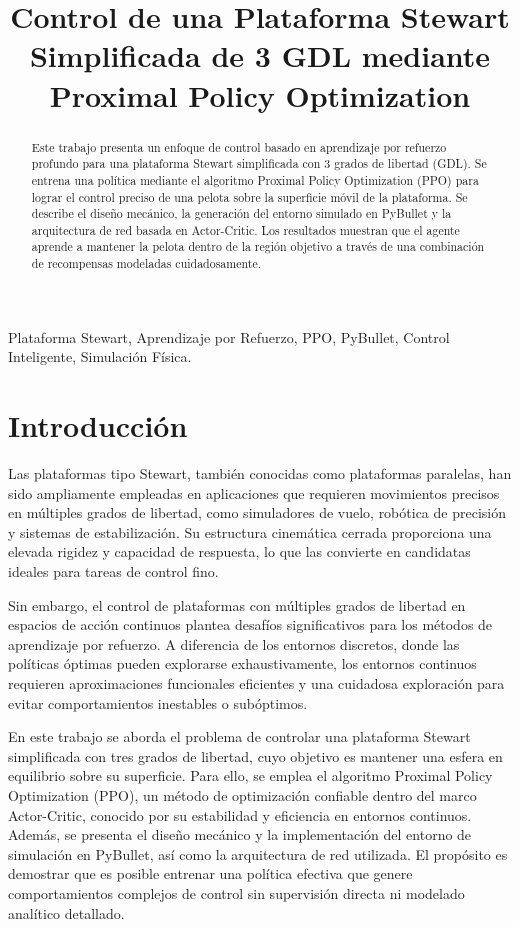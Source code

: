 \documentclass[conference]{IEEEtran}
\title{Control de una Plataforma Stewart Simplificada de 3 GDL mediante Proximal Policy Optimization}
\author{
    \IEEEauthorblockN{Joel Ibaceta}
    \IEEEauthorblockA{
        \textit{Universidad Nacional de Ingeniería} \\
        joel.ibaceta.c@uni.pe
    }
    \and
    \IEEEauthorblockN{Marco Antonio Barrera Ninamango}
    \IEEEauthorblockA{
        \textit{Universidad Nacional de Ingeniería} \\
        marco.barrera.n@uni.pe
    }
    \and
    \IEEEauthorblockN{Jesus Gianpierre Campos Cardenas}
    \IEEEauthorblockA{
        \textit{Universidad Nacional de Ingeniería} \\
        j.campos.c@uni.pe
    }
}
\begin{document}
\maketitle

\begin{abstract}
Este trabajo presenta un enfoque de control basado en aprendizaje por refuerzo profundo para una plataforma Stewart simplificada con 3 grados de libertad (GDL). Se entrena una política mediante el algoritmo Proximal Policy Optimization (PPO) para lograr el control preciso de una pelota sobre la superficie móvil de la plataforma. Se describe el diseño mecánico, la generación del entorno simulado en PyBullet y la arquitectura de red basada en Actor-Critic. Los resultados muestran que el agente aprende a mantener la pelota dentro de la región objetivo a través de una combinación de recompensas modeladas cuidadosamente.
\end{abstract}

\begin{IEEEkeywords}
Plataforma Stewart, Aprendizaje por Refuerzo, PPO, PyBullet, Control Inteligente, Simulación Física.
\end{IEEEkeywords}

\section{Introducción}
Las plataformas tipo Stewart, también conocidas como plataformas paralelas, han sido ampliamente empleadas en aplicaciones que requieren movimientos precisos en múltiples grados de libertad, como simuladores de vuelo, robótica de precisión y sistemas de estabilización. Su estructura cinemática cerrada proporciona una elevada rigidez y capacidad de respuesta, lo que las convierte en candidatas ideales para tareas de control fino.

Sin embargo, el control de plataformas con múltiples grados de libertad en espacios de acción continuos plantea desafíos significativos para los métodos de aprendizaje por refuerzo. A diferencia de los entornos discretos, donde las políticas óptimas pueden explorarse exhaustivamente, los entornos continuos requieren aproximaciones funcionales eficientes y una cuidadosa exploración para evitar comportamientos inestables o subóptimos.

En este trabajo se aborda el problema de controlar una plataforma Stewart simplificada con tres grados de libertad, cuyo objetivo es mantener una esfera en equilibrio sobre su superficie. Para ello, se emplea el algoritmo Proximal Policy Optimization (PPO), un método de optimización confiable dentro del marco Actor-Critic, conocido por su estabilidad y eficiencia en entornos continuos. Además, se presenta el diseño mecánico y la implementación del entorno de simulación en PyBullet, así como la arquitectura de red utilizada. El propósito es demostrar que es posible entrenar una política efectiva que genere comportamientos complejos de control sin supervisión directa ni modelado analítico detallado.
\end{document}
